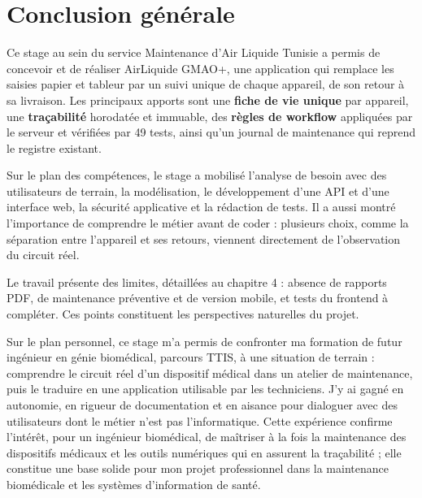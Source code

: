 \chapter*{Conclusion générale}

Ce stage au sein du service Maintenance d'Air Liquide Tunisie a permis de concevoir et de réaliser AirLiquide GMAO+, une application qui remplace les saisies papier et tableur par un suivi unique de chaque appareil, de son retour à sa livraison. Les principaux apports sont une \textbf{fiche de vie unique} par appareil, une \textbf{traçabilité} horodatée et immuable, des \textbf{règles de workflow} appliquées par le serveur et vérifiées par 49 tests, ainsi qu'un journal de maintenance qui reprend le registre existant.

Sur le plan des compétences, le stage a mobilisé l'analyse de besoin avec des utilisateurs de terrain, la modélisation, le développement d'une API et d'une interface web, la sécurité applicative et la rédaction de tests. Il a aussi montré l'importance de comprendre le métier avant de coder : plusieurs choix, comme la séparation entre l'appareil et ses retours, viennent directement de l'observation du circuit réel.

Le travail présente des limites, détaillées au chapitre 4 : absence de rapports PDF, de maintenance préventive et de version mobile, et tests du frontend à compléter. Ces points constituent les perspectives naturelles du projet.

Sur le plan personnel, ce stage m'a permis de confronter ma formation de futur ingénieur en génie biomédical, parcours TTIS, à une situation de terrain : comprendre le circuit réel d'un dispositif médical dans un atelier de maintenance, puis le traduire en une application utilisable par les techniciens. J'y ai gagné en autonomie, en rigueur de documentation et en aisance pour dialoguer avec des utilisateurs dont le métier n'est pas l'informatique. Cette expérience confirme l'intérêt, pour un ingénieur biomédical, de maîtriser à la fois la maintenance des dispositifs médicaux et les outils numériques qui en assurent la traçabilité ; elle constitue une base solide pour mon projet professionnel dans la maintenance biomédicale et les systèmes d'information de santé.

